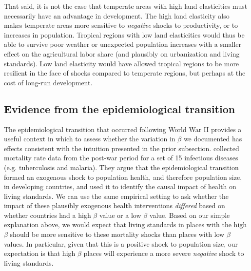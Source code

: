 \documentclass[12pt]{article}
\begin{document}
That said, it is not the case that temperate areas with high land elasticities must necessarily have an advantage in development. The high land elasticity also makes temperate areas more sensitive to \textit{negative} shocks to productivity, or to increases in population. Tropical regions with low land elasticities would thus be able to survive poor weather or unexpected population increases with a smaller effect on the agricultural labor share (and plausibly on urbanization and living standards). Low land elasticity would have allowed tropical regions to be more resilient in the face of shocks compared to temperate regions, but perhaps at the cost of long-run development.

\subsection{Evidence from the epidemiological transition}\label{SEC_ajtest}
The epidemiological transition that occurred following World War II provides a useful context in which to assess whether the variation in $\beta$ we documented has effects consistent with the intuition presented in the prior subsection. \cite{aj07} collected mortality rate data from the post-war period for a set of 15 infectious diseases (e.g. tuberculosis and malaria). They argue that the epidemiological transition formed an exogenous shock to population health, and therefore population size, in developing countries, and used it to identify the causal impact of health on living standards. We can use the same empirical setting to ask whether the impact of these plausibly exogenous health interventions \textit{differed} based on whether countries had a high $\beta$ value or a low $\beta$ value. Based on our simple explanation above, we would expect that living standards in places with the high $\beta$ should be more sensitive to these mortality shocks than places with low $\beta$ values. In particular, given that this is a positive shock to population size, our expectation is that high $\beta$ places will experience a more severe \textit{negative} shock to living standards.
\end{document}
